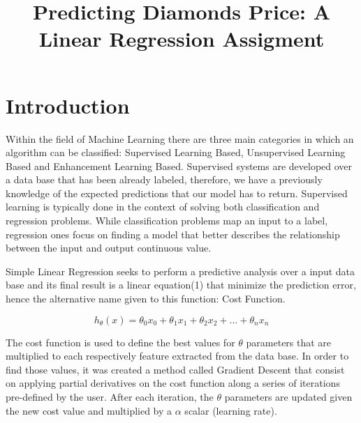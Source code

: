 \documentclass[conference]{IEEEtran}
\begin{document}
\title{Predicting Diamonds Price: A Linear Regression Assigment}

\author{
\and
{}
}

\maketitle

\section{Introduction}

Within the field of Machine Learning there are three main categories in which an algorithm can be classified: Supervised Learning Based, Unsupervised Learning Based and Enhancement Learning Based. Supervised systems are developed over a data base that has been already labeled, therefore, we have a previously knowledge of the expected predictions that our model has to return. Supervised learning is typically done in the context of solving both classification and regression problems.
While classification problems map an input to a label, regression ones focus on finding a model that better describes the relationship between the input and output continuous value.\par

Simple Linear Regression seeks to perform a predictive analysis over a input data base and its final result is a linear equation(1) that minimize the prediction error, hence the alternative name given to this function: Cost Function.

\begin{equation}
h_\theta(x)= \theta_0 x_0 + \theta_1 x_1 + \theta_2 x_2 + ... + \theta_n x_n
\end{equation}

The cost function is used to define the best values for $\theta$ parameters that are multiplied to each respectively feature extracted from the data base. In order to find those values, it was created a method called Gradient Descent that consist on applying partial derivatives on the cost function along a series of iterations pre-defined by the user. After each iteration, the $\theta$ parameters are updated given the new cost value and multiplied by a $\alpha$ scalar (learning rate).
\end{document}
